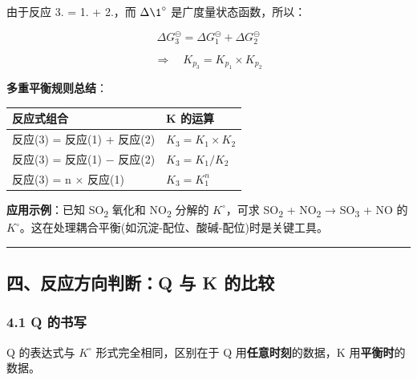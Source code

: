 由于反应 3. = 1. + 2.，而 \(\Delta \1^{\circ}\) 是广度量状态函数，所以：

\[
\Delta G_3^\ominus = \Delta G_1^\ominus + \Delta G_2^\ominus
\]

\[
\Rightarrow \quad \boxed{K_{p_3} = K_{p_1} \times K_{p_2}}
\]

\textbf{多重平衡规则总结}：

{\def\LTcaptype{none} %
\begin{longtable}[]{@{}ll@{}}
\toprule\noalign{}
反应式组合 & K 的运算 \\
\midrule\noalign{}
\endhead
\bottomrule\noalign{}
\endlastfoot
反应(3) = 反应(1) + 反应(2) & \(K_3 = K_1 \times K_2\) \\
反应(3) = 反应(1) − 反应(2) & \(K_3 = K_1 / K_2\) \\
反应(3) = n × 反应(1) & \(K_3 = K_1^n\) \\
\end{longtable}
}

\textbf{应用示例}：已知 SO\textsubscript{2} 氧化和 NO\textsubscript{2} 分解的 \(K^{\circ}\)，可求 SO\textsubscript{2} + NO\textsubscript{2} → SO\textsubscript{3} + NO 的 \(K^{\circ}\)。这在处理耦合平衡(如沉淀-配位、酸碱-配位)时是关键工具。

\begin{center}\rule{0.5\linewidth}{0.5pt}\end{center}

\subsection{四、反应方向判断：Q 与 K 的比较}\label{ux56dbux53cdux5e94ux65b9ux5411ux5224ux65adq-ux4e0e-k-ux7684ux6bd4ux8f83}

\subsubsection{4.1 Q 的书写}\label{q-ux7684ux4e66ux5199}

Q 的表达式与 \(K^{\circ}\) 形式完全相同，区别在于 Q 用\textbf{任意时刻}的数据，K 用\textbf{平衡时}的数据。

